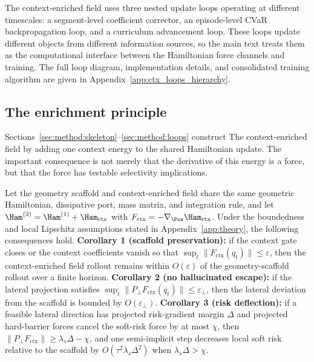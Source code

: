 The context-enriched field uses three nested update loops operating at different
timescales: a segment-level coefficient corrector, an episode-level
CVaR backpropagation loop, and a curriculum advancement loop. These
loops update different objects from different information sources, so
the main text treats them as the computational interface between the
Hamiltonian force channels and training. The full loop diagram,
implementation details, and consolidated training algorithm are given in
Appendix~\ref{app:ctx_loops_hierarchy}.

\subsection{The enrichment principle}
\label{sec:method:enrichment}

Sections~\ref{sec:method:skeleton}--\ref{sec:method:loops} construct
The context-enriched field by adding one context energy to the shared Hamiltonian update.
The important consequence is not merely that the derivative of this
energy is a force, but that the force has testable selectivity
implications.

\begin{proposition}
\label{prop:enrichment}
Let the geometry scaffold and context-enriched field share the same geometric Hamiltonian,
dissipative port, mass matrix, and integration rule, and let
\(\Ham^{(2)}=\Ham^{(1)}+\Ham_{\mathrm{ctx}}\) with
\(F_{\mathrm{ctx}}=-\nabla_{\Pos}\Ham_{\mathrm{ctx}}\). Under the
boundedness and local Lipschitz assumptions stated in
Appendix~\ref{app:theory}, the following consequences hold.
\textbf{Corollary 1 (scaffold preservation):} if the context gate closes
or the context coefficients vanish so that
\(\sup_t\|F_{\mathrm{ctx}}(q_t)\|\le\varepsilon\), then the context-enriched field
rollout remains within \(O(\varepsilon)\) of the geometry-scaffold rollout over a
finite horizon. \textbf{Corollary 2 (no hallucinated escape):} if the
lateral projection satisfies
\(\sup_t\|P_\perp F_{\mathrm{ctx}}(q_t)\|\le\varepsilon_\perp\), then
the lateral deviation from the scaffold is bounded by
\(O(\varepsilon_\perp)\). \textbf{Corollary 3 (risk deflection):} if a
feasible lateral direction has projected risk-gradient margin
\(\Delta\) and projected hard-barrier forces cancel the soft-risk force
by at most \(\chi\), then
\(\|P_\perp F_{\mathrm{ctx}}\|\ge\lambda_s\Delta-\chi\), and one
semi-implicit step decreases local soft risk relative to the scaffold by
\(O(\tau^2\lambda_s\Delta^2)\) when \(\lambda_s\Delta>\chi\).
\end{proposition}

